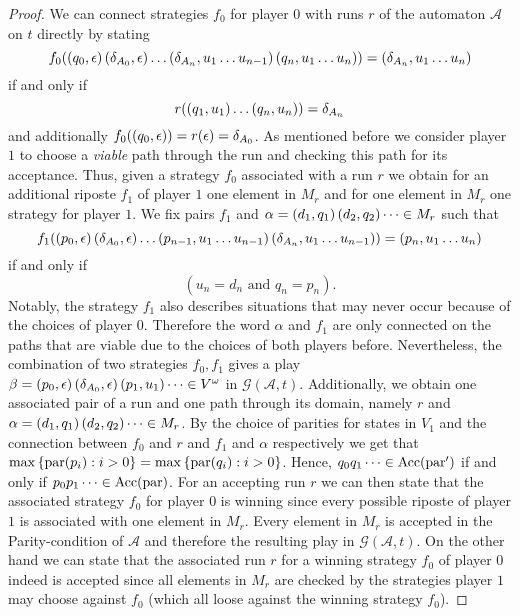 \begin{proof}
  We can connect strategies $f_{0}$ for player $0$ with runs $r$ of the 
  automaton $\mathcal{A}$ on $t$ directly by stating
  \begin{equation*}
    f_{0}(\left(q_{0},\epsilon\right)\left(\delta_{A_{0}},\epsilon\right)\dots
    \left(\delta_{A_{n}}, u_{1}\dots u_{n-1}\right)\left(q_{n},u_{1}\dots u_{n}\right)) =
    \left(\delta_{A_{n}},u_{1}\dots u_{n}\right)
  \end{equation*}
  if and only if 
  \begin{equation*}
    r(\left(q_{1}, u_{1}\right)\dots\left(q_{n}, u_{n}\right)) = \delta_{A_{n}}
  \end{equation*}
  and additionally $f_{0}(\left(q_{0},\epsilon\right)) =r(\epsilon)=\delta_{A_{0}}$. 
  As mentioned before we consider player $1$ to choose a \emph{viable} path 
  through the run and checking this path for its acceptance. Thus, given a 
  strategy $f_{0}$ associated with a run $r$ we obtain for an additional 
  riposte $f_{1}$ of player $1$ one element in $M_{r}$ and for one element in 
  $M_{r}$ one strategy for player $1$. We fix pairs $f_{1}$ and $\alpha = 
  \left(d_{1}, q_{1}\right)\left(d_{2}, q_{2}\right)\dots\in M_{r}$ such that
  \begin{equation*}
    f_{1}(\left(p_{0},\epsilon\right)\left(\delta_{A_{0}},\epsilon\right)\dots
    \left(p_{n-1},u_{1}\dots u_{n-1}\right)\left(\delta_{A_{n}},u_{1}\dots u_{n-1}\right))
    = \left(p_{n}, u_{1}\dots u_{n}\right)
  \end{equation*}
  if and only if 
  \begin{equation*}
    (u_{n} = d_{n}\text{ and }q_{n} = p_{n}).
  \end{equation*}
  Notably, the strategy $f_{1}$ also describes situations that may never occur
  because of the choices of player $0$. Therefore the word $\alpha$ and $f_{1}$
  are only connected on the paths that are viable due to the choices of both
  players before. Nevertheless, the combination of two strategies $f_{0},f_{1}$ 
  gives a play 
  $\beta = \left(p_{0},\epsilon\right)\left(\delta_{A_{0}},\epsilon\right)\left(p_{1}, 
  u_{1}\right)\dots\in V^{\omega}$ in $\mathcal{G}(\mathcal{A}, t)$. Additionally,
  we obtain one associated pair of a run and one path through its domain, 
  namely $r$ and $\alpha = \left(d_{1}, q_{1}\right)\left(d_{2}, q_{2}\right)\dots\in 
  M_{r}$. By the choice of parities for states in $V_{1}$ and the connection 
  between $f_{0}$ and $r$ and $f_{1}$ and $\alpha$ respectively we get that 
  $\max\left\{\operatorname{par}(p_{i}):i>0\right\} = \max\left\{\operatorname{par}(q_{i}):i>0\right\}$. Hence,
  $q_{0}q_{1}\dots\in\operatorname{Acc}(\operatorname{par}')$ if and only if 
  $p_{0}p_{1}\dots\in\operatorname{Acc}(\operatorname{par})$. For an accepting run $r$ we can then state
  that the associated strategy $f_{0}$ for player $0$ is winning since every
  possible riposte of player $1$ is associated with one element in $M_{r}$.
  Every element in $M_{r}$ is accepted in the Parity-condition of $\mathcal{A}$
  and therefore the resulting play in $\mathcal{G}(\mathcal{A}, t)$. On the 
  other hand we can state that the associated run $r$ for a winning strategy 
  $f_{0}$ of player $0$ indeed is accepted since all elements in $M_{r}$ are
  checked by the strategies player $1$ may choose against $f_{0}$ (which all 
  loose against the winning strategy $f_{0}$).
\end{proof}
